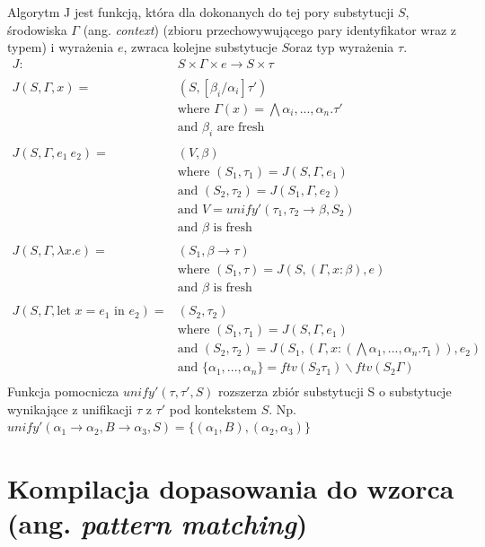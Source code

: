 \documentclass[a4paper,12pt]{book} %
\begin{document}
Algorytm J jest funkcją, która dla dokonanych do tej pory substytucji $S$, środowiska $\Gamma$ (ang. \emph{context}) (zbioru przechowywującego pary identyfikator wraz z typem) i wyrażenia $e$, zwraca kolejne substytucje $S$oraz typ wyrażenia $\tau$.
\begin{equation}
  \begin{split}
    J :& S\times\Gamma\times e \rightarrow S\times\tau \\
    \\
    J(S,\Gamma,x) =& (S,[\beta_i/\alpha_i]\tau') \\
    &\text{where } \Gamma(x) = \bigwedge\alpha_i,...,\alpha_n.\tau' \\
    &\text{and } \beta_i \text{ are fresh} \\
    \\
    J(S,\Gamma,e_1\ e_2) =& (V,\beta) \\
    &\text{where } (S_1,\tau_1) = J(S,\Gamma,e_1) \\
    &\text{and } (S_2,\tau_2)=J(S_1,\Gamma,e_2) \\
    &\text{and } V = unify'(\tau_1,\tau_2\rightarrow\beta,S_2) \\
    &\text{and } \beta \text{ is fresh} \\
    \\
    J(S,\Gamma,\lambda x.e) =& (S_1,\beta\rightarrow\tau) \\
    &\text{where } (S_1,\tau)=J(S,(\Gamma,x:\beta),e) \\
    &\text{and } \beta \text{ is fresh} \\
    \\
    J(S,\Gamma,\text{let }x=e_1\text{ in }e_2) =& (S_2,\tau_2) \\
    &\text{where } (S_1,\tau_1)=J(S,\Gamma,e_1) \\
    &\text{and } (S_2,\tau_2)=J(S_1,(\Gamma,x:(\bigwedge\alpha_1,...,\alpha_n.\tau_1)),e_2) \\
    &\text{and } \{\alpha_1,...,\alpha_n\}=ftv(S_2\tau_1)\backslash ftv(S_2\Gamma) \\
  \end{split}
\end{equation}
Funkcja pomocnicza $unify'(\tau,\tau',S)$ rozszerza zbiór substytucji S o substytucje wynikające z unifikacji $\tau$ z $\tau'$ pod kontekstem $S$. Np. $unify'(\alpha_1\rightarrow\alpha_2,B\rightarrow\alpha_3,S) = \{(\alpha_1,B), (\alpha_2,\alpha_3)\}$

\chapter{Kompilacja dopasowania do wzorca (ang. \emph{pattern matching})}
\end{document}
